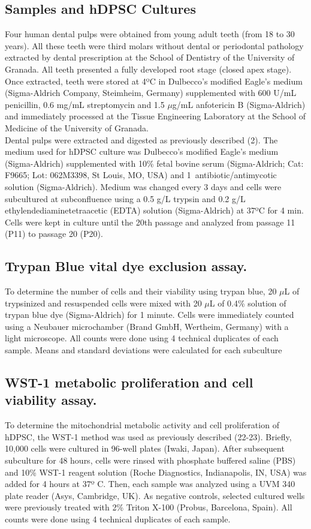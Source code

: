 \documentclass[a4paper,12pt]{article}
\begin{document}
\subsection{Samples and hDPSC Cultures}
Four human dental pulps were obtained from young adult teeth (from 18 to 30 years). All these teeth were third molars without dental or periodontal pathology extracted by dental prescription at the School of Dentistry of the University of Granada. All teeth presented a fully developed root stage (closed apex stage).\\
Once extracted, teeth were stored at 4ºC in Dulbecco’s modified Eagle’s medium (Sigma-Aldrich Company, Steimheim, Germany) supplemented with 600 U/mL penicillin, 0.6 mg/mL streptomycin and 1.5 $\mu$g/mL anfotericin B (Sigma-Aldrich) and immediately processed at the Tissue Engineering Laboratory at the School of Medicine of the University of Granada.\\

Dental pulps were extracted and digested as previously described (2). The medium used for hDPSC culture was Dulbecco’s modified Eagle’s medium (Sigma-Aldrich) supplemented with 10\% fetal bovine serum (Sigma-Aldrich; Cat: F9665; Lot: 062M3398, St Louis, MO, USA) and 1\ antibiotic/antimycotic solution (Sigma-Aldrich). Medium was changed every 3 days and cells were subcultured at subconfluence using a 0.5 g/L trypsin and 0.2 g/L ethylendediaminetetraacetic (EDTA) solution (Sigma-Aldrich) at 37ºC for 4 min. Cells were kept in culture until the 20th passage and analyzed from passage 11 (P11) to passage 20 (P20).\\
\subsection{Trypan Blue vital dye exclusion assay.}
To determine the number of cells and their viability using trypan blue, 20 $\mu$L of trypsinized and resuspended cells were mixed with 20 $\mu$L of 0.4\% solution of trypan blue dye (Sigma-Aldrich) for 1 minute. Cells were immediately counted using a Neubauer microchamber (Brand GmbH, Wertheim, Germany) with a light microscope. All counts were done using 4 technical duplicates of each sample. Means and standard deviations were calculated for each subculture\\
\subsection{WST-1 metabolic proliferation and cell viability assay.}
To determine the mitochondrial metabolic activity and cell proliferation of hDPSC, the WST-1 method was used as previously described (22-23). Briefly, 10,000 cells were cultured in 96-well plates (Iwaki, Japan). After subsequent subculture for 48 hours, cells were rinsed with phosphate buffered saline (PBS) and 10\% WST-1 reagent solution (Roche Diagnostics, Indianapolis, IN, USA) was added for 4 hours at 37º C. Then, each sample was analyzed using a UVM 340 plate reader (Asys, Cambridge, UK). As negative controls, selected cultured wells were previously treated with 2\% Triton X-100 (Probus, Barcelona, Spain). All counts were done using 4 technical duplicates of each sample.\\
\end{document}
